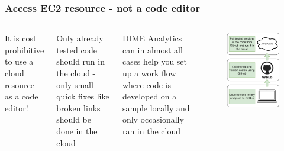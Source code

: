\documentclass[aspectratio=169]{beamer} %
\begin{document}
\begin{frame}
	\frametitle{Access EC2 resource - not a code editor}
	
	\begin{columns}[c]
		
	
		
		It is cost prohibitive to use a cloud resource as a code editor!
		
		\vspace{.5cm}
		
		Only already tested code should run in the cloud - only small quick fixes like broken links should be done in the cloud
		
		\vspace{.5cm}
		
		DIME Analytics can in almost all cases help you set up a work flow where code is developed on a sample locally and only occasionally ran in the cloud
		
		\begin{figure}
			\centering
			\includegraphics[width=.8\textwidth]{./img/code-workflow.png}
		\end{figure}
		
	
	\end{columns}
\end{frame}
\end{document}
